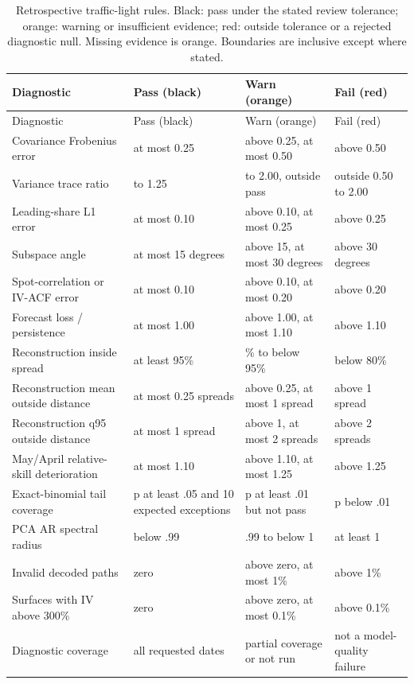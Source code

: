 \documentclass[11pt]{article}
\begin{document}
{\small\setlength{\tabcolsep}{3pt}\begin{longtable}{@{}>{\raggedright\arraybackslash}p{.25\linewidth}>{\raggedright\arraybackslash}p{.22\linewidth}>{\raggedright\arraybackslash}p{.25\linewidth}>{\raggedright\arraybackslash}p{.22\linewidth}@{}}
\caption{Retrospective traffic-light rules. Black: pass under the stated review tolerance; orange: warning or insufficient evidence; red: outside tolerance or a rejected diagnostic null. Missing evidence is orange. Boundaries are inclusive except where stated.}\label{tab:grading-rules}\\
\toprule Diagnostic & Pass (black) & Warn (orange) & Fail (red)\\\midrule\endfirsthead
\toprule Diagnostic & Pass (black) & Warn (orange) & Fail (red)\\\midrule\endhead
Covariance Frobenius error & at most 0.25 & above 0.25, at most 0.50 & above 0.50 \\
Variance trace ratio & 0.80 to 1.25 & 0.50 to 2.00, outside pass & outside 0.50 to 2.00 \\
Leading-share L1 error & at most 0.10 & above 0.10, at most 0.25 & above 0.25 \\
Subspace angle & at most 15 degrees & above 15, at most 30 degrees & above 30 degrees \\
Spot-correlation or IV-ACF error & at most 0.10 & above 0.10, at most 0.20 & above 0.20 \\
Forecast loss / persistence & at most 1.00 & above 1.00, at most 1.10 & above 1.10 \\
Reconstruction inside spread & at least 95\% & 80\% to below 95\% & below 80\% \\
Reconstruction mean outside distance & at most 0.25 spreads & above 0.25, at most 1 spread & above 1 spread \\
Reconstruction q95 outside distance & at most 1 spread & above 1, at most 2 spreads & above 2 spreads \\
May/April relative-skill deterioration & at most 1.10 & above 1.10, at most 1.25 & above 1.25 \\
Exact-binomial tail coverage & p at least .05 and 10 expected exceptions & p at least .01 but not pass & p below .01 \\
PCA AR spectral radius & below .99 & .99 to below 1 & at least 1 \\
Invalid decoded paths & zero & above zero, at most 1\% & above 1\% \\
Surfaces with IV above 300\% & zero & above zero, at most 0.1\% & above 0.1\% \\
Diagnostic coverage & all requested dates & partial coverage or not run & not a model-quality failure \\
\bottomrule\end{longtable}}
\end{document}
